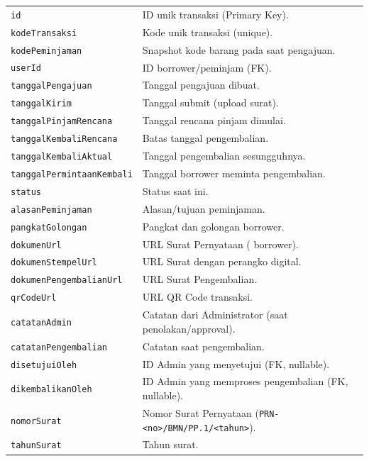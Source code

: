 \documentclass[
  12pt,
  a4paper,
  oneside,
  final
]{report}
\begin{document}
\begin{longtable}[!htbp]{p{3.5cm} p{9cm}}
  \texttt{id}                        & ID unik transaksi (Primary Key). \\
  \texttt{kodeTransaksi}             & Kode unik transaksi (unique). \\
  \texttt{kodePeminjaman}            & Snapshot kode barang pada saat pengajuan. \\
  \texttt{userId}                    & ID borrower/peminjam (FK). \\
  \texttt{tanggalPengajuan}          & Tanggal pengajuan dibuat. \\
  \texttt{tanggalKirim}             & Tanggal submit (upload surat). \\
  \texttt{tanggalPinjamRencana}     & Tanggal rencana pinjam dimulai. \\
  \texttt{tanggalKembaliRencana}    & Batas tanggal pengembalian. \\
  \texttt{tanggalKembaliAktual}     & Tanggal pengembalian sesungguhnya. \\
  \texttt{tanggalPermintaanKembali} & Tanggal borrower meminta pengembalian. \\
  \texttt{status}                   & Status saat ini. \\
  \texttt{alasanPeminjaman}         & Alasan/tujuan peminjaman. \\
  \texttt{pangkatGolongan}          & Pangkat dan golongan borrower. \\
  \texttt{dokumenUrl}               & URL Surat Pernyataan ( borrower). \\
  \texttt{dokumenStempelUrl}        & URL Surat dengan perangko digital. \\
  \texttt{dokumenPengembalianUrl}   & URL Surat Pengembalian. \\
  \texttt{qrCodeUrl}               & URL QR Code transaksi. \\
  \texttt{catatanAdmin}             & Catatan dari Administrator (saat penolakan/approval). \\
  \texttt{catatanPengembalian}      & Catatan saat pengembalian. \\
  \texttt{disetujuiOleh}            & ID Admin yang menyetujui (FK, nullable). \\
  \texttt{dikembalikanOleh}         & ID Admin yang memproses pengembalian (FK, nullable). \\
  \texttt{nomorSurat}               & Nomor Surat Pernyataan (\texttt{PRN-<no>/BMN/PP.1/<tahun>}). \\
  \texttt{tahunSurat}               & Tahun surat. \\
\end{longtable}
\end{document}
